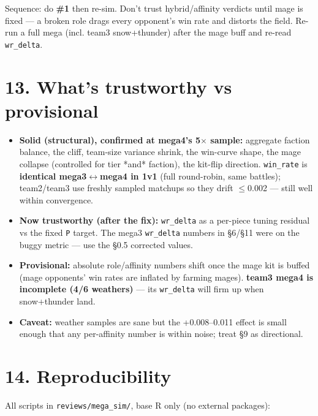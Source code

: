 \documentclass[10pt]{article}
\begin{document}
Sequence: do \textbf{\#1} then re-sim. Don't trust hybrid/affinity verdicts until mage is fixed --- a broken role drags every opponent's win rate and distorts the field. Re-run a full mega (incl. team3 snow+thunder) after the mage buff and re-read \texttt{wr\_\allowbreak{}delta}.\\


\section*{13. What's trustworthy vs provisional}

\begin{itemize}
\item \textbf{Solid (structural), confirmed at mega4's 5$\times$ sample:} aggregate faction balance, the cliff, team-size variance shrink, the win-curve shape, the mage collapse (controlled for tier *and* faction), the kit-flip direction. \texttt{win\_\allowbreak{}rate} is \textbf{identical mega3$\leftrightarrow$mega4 in 1v1} (full round-robin, same battles); team2/team3 use freshly sampled matchups so they drift $\leq$0.002 --- still well within convergence.
\item \textbf{Now trustworthy (after the fix):} \texttt{wr\_\allowbreak{}delta} as a per-piece tuning residual vs the fixed \texttt{P} target. The mega3 \texttt{wr\_\allowbreak{}delta} numbers in \S{}6/\S{}11 were on the buggy metric --- use the \S{}0.5 corrected values.
\item \textbf{Provisional:} absolute role/affinity numbers shift once the mage kit is buffed (mage opponents' win rates are inflated by farming mages). \textbf{team3 mega4 is incomplete (4/6 weathers)} --- its \texttt{wr\_\allowbreak{}delta} will firm up when snow+thunder land.
\item \textbf{Caveat:} weather samples are sane but the +0.008--0.011 effect is small enough that any per-affinity number is within noise; treat \S{}9 as directional.
\end{itemize}


\section*{14. Reproducibility}

All scripts in \texttt{reviews/\allowbreak{}mega\_\allowbreak{}sim/\allowbreak{}}, base R only (no external packages):\\
\end{document}
